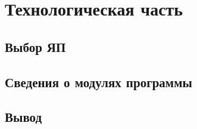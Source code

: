 \chapter{Технологическая часть}

\section{Выбор ЯП}



\section{Сведения о модулях программы}







\section{Вывод}


